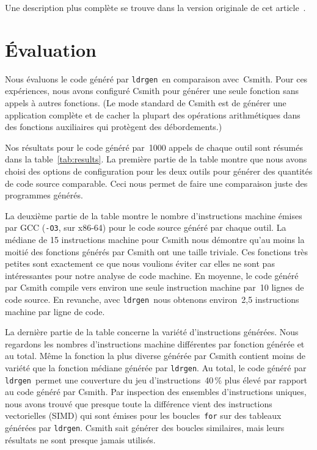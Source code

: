 \documentclass[a4paper]{easychair}
\newcommand\ldrgen{\texttt{ldrgen}}
\begin{document}

Une description plus complète se trouve dans la version originale de cet
article~\cite{ldrgen-2017}.


\section{Évaluation}

Nous évaluons le code généré par \ldrgen\ en comparaison avec~Csmith. Pour
ces expériences, nous avons configuré Csmith pour générer une seule
fonction sans appels à autres fonctions. (Le mode standard de Csmith est de
générer une application complète et de cacher la plupart des opérations
arithmétiques dans des fonctions auxiliaires qui protègent des
débordements.)

Nos résultats pour le code généré par~1000 appels de chaque outil sont
résumés dans la table~\ref{tab:results}. La première partie de la table
montre que nous avons choisi des options de configuration pour les deux
outils pour générer des quantités de code source comparable. Ceci nous
permet de faire une comparaison juste des programmes générés.

La deuxième partie de la table montre le nombre d'instructions machine
émises par GCC (\texttt{-O3}, sur x86-64) pour le code source généré par
chaque outil. La médiane de 15 instructions machine pour Csmith nous
démontre qu'au moins la moitié des fonctions générés par Csmith ont une
taille triviale. Ces fonctions très petites sont exactement ce que nous
voulions éviter car elles ne sont pas intéressantes pour notre analyse de
code machine. En moyenne, le code généré par Csmith compile vers environ une
seule instruction machine par~10 lignes de code source. En revanche, avec
\ldrgen\ nous obtenons environ~2,5 instructions machine par ligne de code.

La dernière partie de la table concerne la variété d'instructions générées.
Nous regardons les nombres d'instructions machine différentes par fonction
générée et au total. Même la fonction la plus diverse générée par Csmith
contient moins de variété que la fonction médiane générée par \ldrgen. Au
total, le code généré par \ldrgen\ permet une couverture du jeu
d'instructions~40\,\% plus élevé par rapport au code généré par Csmith. Par
inspection des ensembles d'instructions uniques, nous avons trouvé que
presque toute la différence vient des instructions vectorielles (SIMD) qui
sont émises pour les boucles~\texttt{for} sur des tableaux générées par
\ldrgen. Csmith sait générer des boucles similaires, mais leurs résultats ne
sont presque jamais utilisés.
\end{document}
